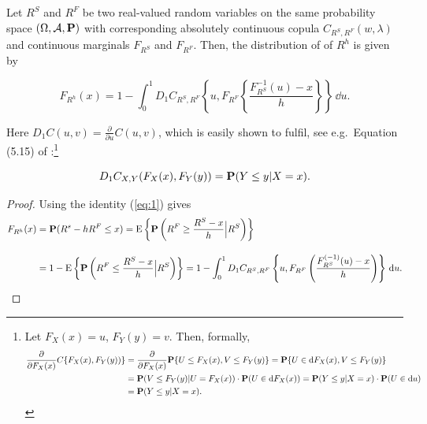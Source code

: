 \begin{proposition}
  \label{prop:dfrh}
  Let $R^S$ and $R^F$ be two real-valued random variables on the same
  probability space $(\Omega, \mathcal A, {\bf P})$ with corresponding
  absolutely continuous copula $C_{R^S, R^F}(w,\lambda)$ and
  continuous marginals $F_{R^S}$ and $F_{R^F}$. Then, the distribution
  of of $R^h$ is given by
  
  
  \begin{equation}
    \label{eq:3}
    F_{R^h}(x) = 1- \int^1_0 D_1 C_{R^S, R^F}
    \left\{ u, F_{R^F} \left\{ \frac{F^{-1}_{R^S}(u)-x}{h} \right\}
    \right\}\, \dd u.
  \end{equation}
\end{proposition}
Here $D_1 C(u,v)=\displaystyle \frac{\partial}{\partial u} C(u,v)$,
which is easily shown to fulfil, see e.g.\ Equation (5.15) of
\citep{McNeil2005}:\footnote{%
  Let $F_X(x)=u$, $F_Y(y)=v$. Then, formally,
  \begin{align*}
    \frac{\partial}{\partial F_X(x)} C\{F_X(x), F_Y(y))\}%
    &= \frac{\partial}{\partial F_X(x)} \p\{U\leq F_X(x),
      V\leq F_Y(y)\} %
      = \p\{U\in \dd F_X(x), V\leq F_Y(y)\}\\ %
    &= \p(V\leq F_Y(y)| U = F_X(x))\cdot \p(U \in \dd
      F_X(x)) %
      = \p(Y\leq y|X=x)\cdot \p(U\in \dd u)\\ %
    &= \p(Y\leq y|X=x).
  \end{align*}}

\begin{equation}
  \label{eq:1}
  D_1 C_{X,Y}(F_X(x), F_Y(y)) = {\bf P}(Y\leq y|X=x).
\end{equation}
\begin{proof}
  Using the identity (\ref{eq:1}) gives
  \begin{align*}
    F_{R^h}(x) &= \p(R^s - h R^F\leq x) %
                 = \operatorname{E}\left\{\p\left(R^F\geq \frac{R^S-x}{h}\Big|
                 R^S\right)\right\}\\[10pt]
               &= 1-\operatorname{E}\left\{\p\left(R^F\leq \frac{R^S-x}{h}\Big|
                 R^S\right)\right\}%
               = 1- \int_0^1 D_1 C_{R^S, R^F}\left\{u,
                 F_{R^F}\left(\frac{F^{(-1)}_{R^S}(u) -
                 x}{h}\right)\right\}\, \dd u.
  \end{align*}
\end{proof}\medskip


